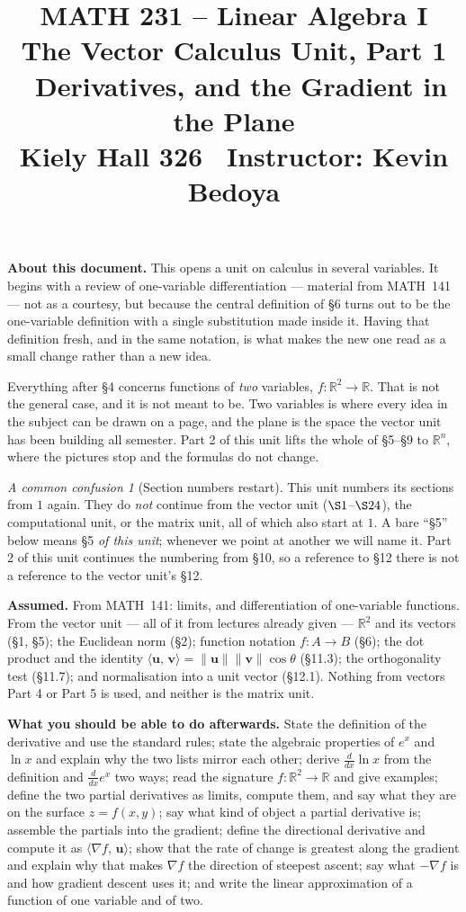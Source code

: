 \documentclass[11pt]{article}
\title{\vspace{-1.2cm}\textbf{\sffamily MATH 231 -- Linear Algebra I}\\[4pt]
       {\large\sffamily The Vector Calculus Unit, Part 1 \textbullet\
        Derivatives, and the Gradient in the Plane}\\[2pt]
       {\normalsize\sffamily Kiely Hall 326 \textbullet\
        Instructor: Kevin Bedoya}}
\author{}
\date{}
\theoremstyle{plain}
\theoremstyle{definition}
\theoremstyle{remark}
\newtheorem*{warn}{A common confusion}
\newcommand{\R}{\mathbb{R}}
\newcommand{\vc}[1]{\mathbf{#1}}
\newcommand{\norm}[1]{\lVert #1\rVert}
\newcommand{\ip}[2]{\langle #1,\, #2\rangle}
\newcommand{\grad}{\nabla}
\begin{document}
\maketitle
\vspace{-1.6cm}

\noindent\textbf{About this document.} This opens a unit on calculus in several
variables. It begins with a review of one-variable differentiation --- material
from MATH~141 --- not as a courtesy, but because the central definition of
\S6 turns out to be the one-variable definition with a single substitution made
inside it. Having that definition fresh, and in the same notation, is what makes
the new one read as a small change rather than a new idea.

Everything after \S4 concerns functions of \emph{two} variables,
$f:\R^{2}\to\R$. That is not the general case, and it is not meant to be. Two
variables is where every idea in the subject can be drawn on a page, and the
plane is the space the vector unit has been building all semester. Part 2 of
this unit lifts the whole of \S5--\S9 to $\R^{n}$, where the pictures stop and
the formulas do not change.

\begin{warn}[Section numbers restart]
This unit numbers its sections from $1$ again. They do \emph{not} continue from
the vector unit ($\S1$--$\S24$), the computational unit, or the matrix unit, all
of which also start at $1$. A bare ``\S5'' below means \S5 \emph{of this unit};
whenever we point at another we will name it. Part 2 of this unit continues the
numbering from \S10, so a reference to \S12 there is not a reference to the
vector unit's \S12.
\end{warn}

\medskip
\noindent\textbf{Assumed.} From MATH~141: limits, and differentiation of
one-variable functions. From the vector unit --- all of it from lectures already
given --- $\R^{2}$ and its vectors (\S1, \S5); the Euclidean norm (\S2);
function notation $f:A\to B$ (\S6); the dot product and the identity
$\ip{\vc{u}}{\vc{v}}=\norm{\vc{u}}\norm{\vc{v}}\cos\theta$ (\S11.3); the
orthogonality test (\S11.7); and normalisation into a unit vector (\S12.1).
Nothing from vectors Part 4 or Part 5 is used, and neither is the matrix unit.

\medskip
\noindent\textbf{What you should be able to do afterwards.} State the definition
of the derivative and use the standard rules; state the algebraic properties of
$e^{x}$ and $\ln x$ and explain why the two lists mirror each other; derive
$\tfrac{d}{dx}\ln x$ from the definition and $\tfrac{d}{dx}e^{x}$ two ways; read
the signature $f:\R^{2}\to\R$ and give examples; define the two partial
derivatives as limits, compute them, and say what they are on the surface
$z=f(x,y)$; say what kind of object a partial derivative is; assemble the
partials into the gradient; define the directional derivative and compute it as
$\ip{\grad f}{\vc{u}}$; show that the rate of change is greatest along the
gradient and explain why that makes $\grad f$ the direction of steepest ascent;
say what $-\grad f$ is and how gradient descent uses it; and write the linear
approximation of a function of one variable and of two.
\end{document}
